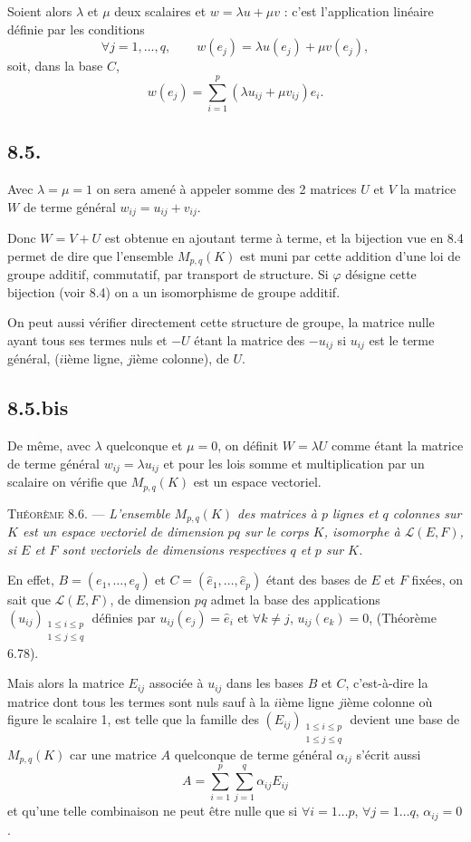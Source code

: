 Soient alors $\lambda$ et $\mu$ deux scalaires et $w=\lambda u+\mu v$ : c'est l'application linéaire définie par les conditions
\[
\forall j=1,\ldots,q,\qquad w(e_j)=\lambda u(e_j)+\mu v(e_j),
\]
soit, dans la base $C$,
\[
w(e_j)=\sum_{i=1}^p(\lambda u_{ij}+\mu v_{ij})\hat e_i.
\]

\subsection*{8.5.}
Avec $\lambda=\mu=1$ on sera amené à appeler somme des 2 matrices $U$ et $V$ la matrice $W$ de terme général $w_{ij}=u_{ij}+v_{ij}$.

Donc $W=V+U$ est obtenue en ajoutant terme à terme, et la bijection vue en 8.4 permet de dire que l'ensemble $M_{p,q}(K)$ est muni par cette addition d'une loi de groupe additif, commutatif, par transport de structure. Si $\varphi$ désigne cette bijection (voir 8.4) on a un isomorphisme de groupe additif.

On peut aussi vérifier directement cette structure de groupe, la matrice nulle ayant tous ses termes nuls et $-U$ étant la matrice des $-u_{ij}$ si $u_{ij}$ est le terme général, ($i$ième ligne, $j$ième colonne), de $U$.

\subsection*{8.5.bis}
De même, avec $\lambda$ quelconque et $\mu=0$, on définit $W=\lambda U$ comme étant la matrice de terme général $w_{ij}=\lambda u_{ij}$ et pour les lois somme et multiplication par un scalaire on vérifie que $M_{p,q}(K)$ est un espace vectoriel.

\medskip\noindent\textsc{Théorème 8.6.} --- \emph{L'ensemble $M_{p,q}(K)$ des matrices à $p$ lignes et $q$ colonnes sur $K$ est un espace vectoriel de dimension $pq$ sur le corps $K$, isomorphe à $\mathcal L(E,F)$, si $E$ et $F$ sont vectoriels de dimensions respectives $q$ et $p$ sur $K$.}

En effet, $B=(e_1,\ldots,e_q)$ et $C=(\hat e_1,\ldots,\hat e_p)$ étant des bases de $E$ et $F$ fixées, on sait que $\mathcal L(E,F)$, de dimension $pq$ admet la base des applications $(u_{ij})_{\substack{1\le i\le p\\1\le j\le q}}$ définies par $u_{ij}(e_j)=\hat e_i$ et $\forall k\ne j$, $u_{ij}(e_k)=0$, (Théorème 6.78).

Mais alors la matrice $E_{ij}$ associée à $u_{ij}$ dans les bases $B$ et $C$, c'est-à-dire la matrice dont tous les termes sont nuls sauf à la $i$ième ligne $j$ième colonne où figure le scalaire 1, est telle que la famille des $(E_{ij})_{\substack{1\le i\le p\\1\le j\le q}}$ devient une base de $M_{p,q}(K)$ car une matrice $A$ quelconque de terme général $\alpha_{ij}$ s'écrit aussi
\[
A=\sum_{i=1}^p\sum_{j=1}^q\alpha_{ij}E_{ij}
\]
et qu'une telle combinaison ne peut être nulle que si $\forall i=1\ldots p$, $\forall j=1\ldots q$, $\alpha_{ij}=0$. \bookend

